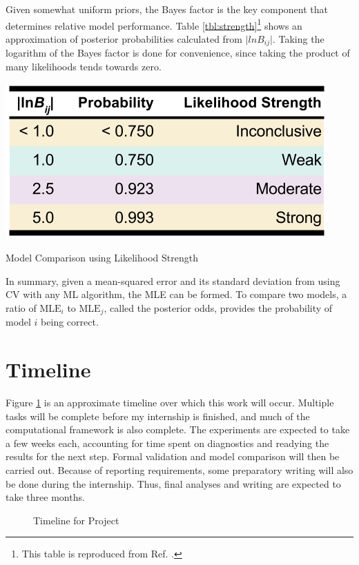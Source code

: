 Given somewhat uniform priors, the Bayes factor is the key component that
determines relative model performance. Table \ref{tbl:strength}\footnote{This
table is reproduced from Ref. \cite{bayes_compare}.} shows an approximation of
posterior probabilities calculated from $\lvert lnB_{ij} \rvert$. Taking the
logarithm of the Bayes factor is done for convenience, since taking the product
of many likelihoods tends towards zero.

\begin{table}[!hbt]
  \centering
  \includegraphics[width=0.7\linewidth]{./chapters/proposal/evidence-strength.png}
  \caption{Model Comparison using Likelihood Strength}
  \label{tbl:strength}
\end{table}

In summary, given a mean-squared error and its standard deviation from using
\gls{CV} with any \gls{ML} algorithm, the \gls{MLE} can be formed. To
compare two models, a ratio of $\text{MLE}_i$ to $\text{MLE}_j$, called the
posterior odds, provides the probability of model $i$ being correct.

\section{Timeline}
\label{sec:timeline}

Figure \ref{fig:time} is an approximate timeline over which this work will
occur.  Multiple tasks will be complete before my internship is finished, and
much of the computational framework is also complete. The experiments are
expected to take a few weeks each, accounting for time spent on diagnostics and
readying the results for the next step. Formal validation and model comparison
will then be carried out. Because of reporting requirements, some preparatory
writing will also be done during the internship. Thus, final analyses and
writing are expected to take three months. 

\begin{figure}
  \caption{Timeline for Project}
  \label{fig:time}
\end{figure}

